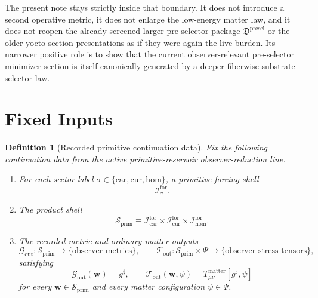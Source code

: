 \documentclass[11pt]{article}
\newcommand{\CompletedMetric}{g^{\sharp}}
\newcommand{\MatterSpace}{\Psi}
\newcommand{\Car}{\mathrm{car}}
\newcommand{\Cur}{\mathrm{cur}}
\newcommand{\Hom}{\mathrm{hom}}
\newcommand{\ForSpace}[1]{\mathcal I_{#1}^{\mathrm{for}}}
\newcommand{\PrimShell}{\mathcal S_{\mathrm{prim}}}
\newcommand{\MetricOut}{\mathscr G_{\mathrm{out}}}
\newcommand{\MatterOut}{\mathscr T_{\mathrm{out}}}
\newcommand{\PreSelectorPackage}{\mathfrak D^{\mathrm{presel}}}
\newtheorem{definition}{Definition}
\begin{document}
The present note stays strictly inside that boundary. It does not introduce a second operative metric, it does not enlarge the low-energy matter law, and it does not reopen the already-screened larger pre-selector package \(\PreSelectorPackage\) or the older yocto-section presentations as if they were again the live burden. Its narrower positive role is to show that the current observer-relevant pre-selector minimizer section is itself canonically generated by a deeper fiberwise substrate selector law.

\section{Fixed Inputs}

\begin{definition}[Recorded primitive continuation data]
\label{def:fixed}
Fix the following continuation data from the active primitive-reservoir observer-reduction line.
\begin{enumerate}
    \item For each sector label \(\sigma\in\{\Car,\Cur,\Hom\}\), a primitive forcing shell
    \[
    \ForSpace{\sigma}.
    \]
    \item The product shell
    \[
    \PrimShell
    \equiv
    \ForSpace{\Car}\times \ForSpace{\Cur}\times \ForSpace{\Hom}.
    \]
    \item The recorded metric and ordinary-matter outputs
    \[
    \MetricOut:\PrimShell\to\{\text{observer metrics}\},
    \qquad
    \MatterOut:\PrimShell\times\MatterSpace\to\{\text{observer stress tensors}\},
    \]
    satisfying
    \begin{equation}
    \MetricOut(\mathbf w)=\CompletedMetric,
    \qquad
    \MatterOut(\mathbf w,\psi)
    =
    T_{\mu\nu}^{\mathrm{matter}}[\CompletedMetric,\psi]
    \label{eq:fixedoutputs}
    \end{equation}
    for every \(\mathbf w\in\PrimShell\) and every matter configuration \(\psi\in\MatterSpace\).
\end{enumerate}
\end{definition}
\end{document}
